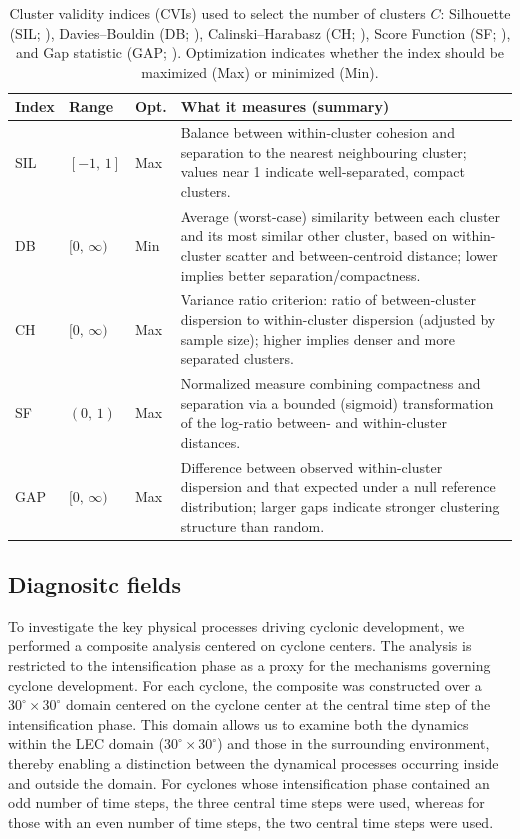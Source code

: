 \documentclass[pdflatex,sn-chicago]{sn-jnl}%
\theoremstyle{plain}
\theoremstyle{definition}
\theoremstyle{remark}
\theoremstyle{definition}
\begin{document}
\begin{table}[t]
\centering
\caption{Cluster validity indices (CVIs) used to select the number of clusters $C$: Silhouette (SIL; \citealp{rousseeuw1987silhouettes}), Davies--Bouldin (DB; \citealp{davies2009cluster}), Calinski--Harabasz (CH; \citealp{calinski1974dendrite}), Score Function (SF; \citealp{saitta2008comprehensive}), and Gap statistic (GAP; \citealp{tibshirani2001estimating}). Optimization indicates whether the index should be maximized (Max) or minimized (Min).}
\label{tab:cvi_summary}
\begin{tabular}{p{0.8cm}p{1cm}p{0.8cm}p{7.2cm}}
\toprule
\textbf{Index} & \textbf{Range} & \textbf{Opt.} & \textbf{What it measures (summary)} \\
\midrule
SIL & $[-1,\,1]$ & Max &
Balance between within-cluster cohesion and separation to the nearest neighbouring cluster; values near 1 indicate well-separated, compact clusters. \\
DB  & $[0,\,\infty)$ & Min &
Average (worst-case) similarity between each cluster and its most similar other cluster, based on within-cluster scatter and between-centroid distance; lower implies better separation/compactness. \\
CH  & $[0,\,\infty)$ & Max &
Variance ratio criterion: ratio of between-cluster dispersion to within-cluster dispersion (adjusted by sample size); higher implies denser and more separated clusters. \\
SF  & $(0,\,1)$ & Max &
Normalized measure combining compactness and separation via a bounded (sigmoid) transformation of the log-ratio between- and within-cluster distances. \\
GAP & $[0,\,\infty)$ & Max &
Difference between observed within-cluster dispersion and that expected under a null reference distribution; larger gaps indicate stronger clustering structure than random. \\
\bottomrule
\end{tabular}
\end{table}



\subsection{Diagnositc fields}

To investigate the key physical processes driving cyclonic development, we performed a composite analysis centered on cyclone centers. The analysis is restricted to the intensification phase as a proxy for the mechanisms governing cyclone development. For each cyclone, the composite was constructed over a $30^{\circ} \times 30^{\circ}$ domain centered on the cyclone center at the central time step of the intensification phase. This domain allows us to examine both the dynamics within the LEC domain ($30^{\circ} \times 30^{\circ}$) and those in the surrounding environment, thereby enabling a distinction between the dynamical processes occurring inside and outside the domain. For cyclones whose intensification phase contained an odd number of time steps, the three central time steps were used, whereas for those with an even number of time steps, the two central time steps were used.
\end{document}
